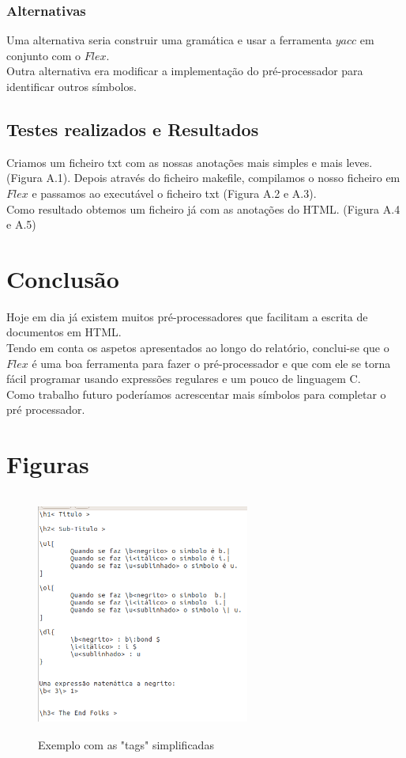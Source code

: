 \documentclass{report}
\begin{document}
\subsection{Alternativas}

Uma alternativa seria construir uma gramática e usar a ferramenta $yacc$ em conjunto com o $Flex$.\\
Outra alternativa era modificar a implementação do pré-processador para identificar outros símbolos.

\section{Testes realizados e Resultados}

Criamos um ficheiro txt com as nossas anotações mais simples e mais leves. (Figura A.1). Depois através do ficheiro makefile, compilamos o nosso ficheiro em $Flex$ e passamos ao executável o ficheiro txt (Figura A.2 e A.3).\\ 
Como resultado obtemos um ficheiro já com as anotações do HTML. (Figura A.4 e A.5) 



\chapter{Conclusão} \label{concl}

Hoje em dia já existem muitos pré-processadores que facilitam a escrita de documentos em HTML.\\
Tendo em conta os aspetos apresentados ao longo do relatório, conclui-se que o $Flex$ é uma boa ferramenta para fazer o pré-processador e que com ele se torna fácil programar usando expressões regulares e um pouco de linguagem C. \\
Como trabalho futuro poderíamos acrescentar mais símbolos para completar o pré processador.


\appendix
\chapter{Figuras}
\begin{figure}[h]
\centering
\includegraphics[width=7cm,height= 8cm]{exemplo1.png}
\caption{Exemplo com as "tags" simplificadas}
\label{Exemplo 1}
\end{figure}
\end{document}
